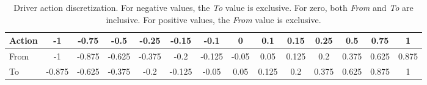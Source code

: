 \begin{table}[htbp]
\footnotesize
\centering
\centerfloat
\setlength{\tabcolsep}{3pt}
\begin{tabular}{@{}lccccccccccccc@{}}
\toprule
Action & -1     & -0.75  & -0.5   & -0.25  & -0.15  & -0.1   & 0     & 0.1   & 0.15  & 0.25  & 0.5   & 0.75  & 1 \\ \midrule
From   & -1   & -0.875 & -0.625 & -0.375 & -0.2   & -0.125 & -0.05 & 0.05  & 0.125 & 0.2   & 0.375 & 0.625 & 0.875 \\ 
To     & -0.875 & -0.625 & -0.375 & -0.2   & -0.125 & -0.05  & 0.05  & 0.125 & 0.2   & 0.375 & 0.625 & 0.875 & 1  \\ \bottomrule
\end{tabular}

\caption[Driver action discretization]{Driver action discretization. For negative values, the \emph{To} value is exclusive. For zero, both \emph{From} and \emph{To} are inclusive. For positive values, the \emph{From} value is exclusive.}
\label{tab:action_dist}
\end{table} 